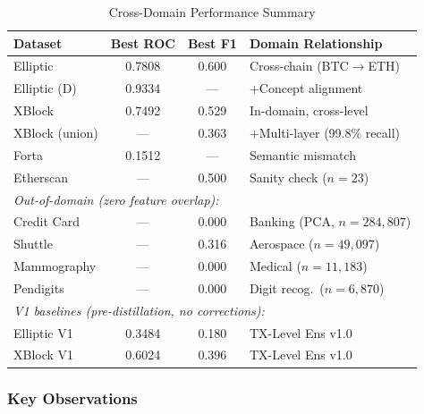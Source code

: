 \documentclass[journal]{IEEEtran}
\begin{document}
\begin{table}[!t]
\centering
\caption{Cross-Domain Performance Summary}
\label{tab:crossdomain}
\footnotesize
\begin{tabular}{lccl}
\toprule
\textbf{Dataset} & \textbf{Best ROC} & \textbf{Best F1} & \textbf{Domain Relationship} \\
\midrule
Elliptic      & 0.7808 & 0.600 & Cross-chain (BTC$\to$ETH) \\
Elliptic (D)  & 0.9334 & ---   & +Concept alignment \\
XBlock        & 0.7492 & 0.529 & In-domain, cross-level \\
XBlock (union)& ---    & 0.363 & +Multi-layer (99.8\% recall) \\
Forta         & 0.1512 & ---   & Semantic mismatch \\
Etherscan     & ---    & 0.500 & Sanity check ($n = 23$) \\
\midrule
\multicolumn{4}{l}{\textit{Out-of-domain (zero feature overlap):}} \\
Credit Card   & ---    & 0.000 & Banking (PCA, $n = 284{,}807$) \\
Shuttle       & ---    & 0.316 & Aerospace ($n = 49{,}097$) \\
Mammography   & ---    & 0.000 & Medical ($n = 11{,}183$) \\
Pendigits     & ---    & 0.000 & Digit recog.\ ($n = 6{,}870$) \\
\midrule
\multicolumn{4}{l}{\textit{V1 baselines (pre-distillation, no corrections):}} \\
Elliptic V1   & 0.3484 & 0.180 & TX-Level Ens v1.0 \\
XBlock V1     & 0.6024 & 0.396 & TX-Level Ens v1.0 \\
\bottomrule
\end{tabular}
\end{table}

\subsubsection{Key Observations}
\end{document}
